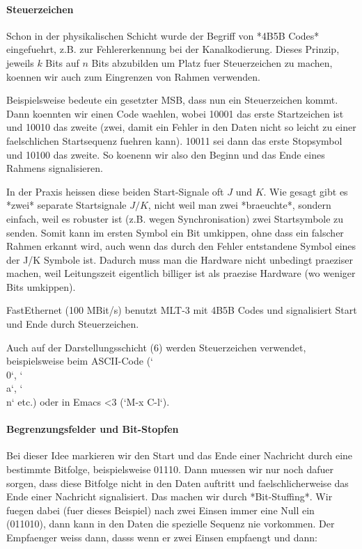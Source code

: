 \paragraph{Steuerzeichen} 

Schon in der physikalischen Schicht wurde der Begriff von *4B5B Codes*
eingefuehrt, z.B. zur Fehlererkennung bei der Kanalkodierung. Dieses Prinzip,
jeweils $k$ Bits auf $n$ Bits abzubilden um Platz fuer Steuerzeichen zu machen,
koennen wir auch zum Eingrenzen von Rahmen verwenden.

Beispielsweise bedeute ein gesetzter MSB, dass nun ein Steuerzeichen kommt. Dann
koennten wir einen Code waehlen, wobei 10001 das erste Startzeichen ist und
10010 das zweite (zwei, damit ein Fehler in den Daten nicht so leicht zu einer
faelschlichen Startsequenz fuehren kann). 10011 sei dann das erste Stopsymbol
und 10100 das zweite. So koenenn wir also den Beginn und das Ende eines Rahmens
signalisieren.

In der Praxis heissen diese beiden Start-Signale oft $J$ und $K$. Wie gesagt
gibt es *zwei* separate Startsignale $J/K$, nicht weil man zwei *braeuchte*,
sondern einfach, weil es robuster ist (z.B. wegen Synchronisation) zwei
Startsymbole zu senden. Somit kann im ersten Symbol ein Bit umkippen, ohne dass
ein falscher Rahmen erkannt wird, auch wenn das durch den Fehler entstandene
Symbol eines der J/K Symbole ist. Dadurch muss man die Hardware nicht unbedingt
praeziser machen, weil Leitungszeit eigentlich billiger ist als praezise
Hardware (wo weniger Bits umkippen).

FastEthernet (100 MBit/s) benutzt MLT-3 mit 4B5B Codes und signalisiert Start
und Ende durch Steuerzeichen.

Auch auf der Darstellungsschicht (6) werden Steuerzeichen verwendet,
beispielsweise beim ASCII-Code (`\\0`, `\\a`, `\\n` etc.) oder in Emacs <3 (`M-x C-l`).

\paragraph{Begrenzungsfelder und Bit-Stopfen} 

Bei dieser Idee markieren wir den Start und das Ende einer Nachricht durch eine
bestimmte Bitfolge, beispielsweise 01110. Dann muessen wir nur noch dafuer
sorgen, dass diese Bitfolge nicht in den Daten auftritt und faelschlicherweise
das Ende einer Nachricht signalisiert. Das machen wir durch *Bit-Stuffing*. Wir
fuegen dabei (fuer dieses Beispiel) nach zwei Einsen immer eine Null ein
(011010), dann kann in den Daten die spezielle Sequenz nie vorkommen. Der
Empfaenger weiss dann, dasss wenn er zwei Einsen empfaengt und dann:

